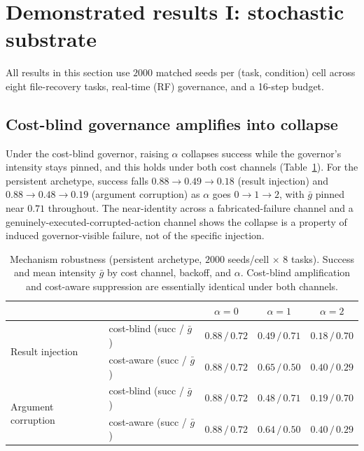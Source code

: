 \documentclass[11pt]{article}
\begin{document}
\section{Demonstrated results I: stochastic substrate}
\label{sec:stochastic}

All results in this section use $2000$ matched seeds per (task, condition)
cell across eight file-recovery tasks, real-time (RF) governance, and a
16-step budget.

\subsection{Cost-blind governance amplifies into collapse}
\label{sec:amplification}

Under the cost-blind governor, raising $\alpha$ collapses success while the
governor's intensity stays pinned, and this holds under both cost channels
(Table~\ref{tab:mechanisms}). For the persistent archetype, success falls
$0.88\to0.49\to0.18$ (result injection) and $0.88\to0.48\to0.19$ (argument
corruption) as $\alpha$ goes $0\to1\to2$, with $\bar g$ pinned near $0.71$
throughout. The near-identity across a fabricated-failure channel and a
genuinely-executed-corrupted-action channel shows the collapse is a property of
induced governor-visible failure, not of the specific injection.

\begin{table}[t]
\centering
\caption{Mechanism robustness (persistent archetype, $2000$ seeds/cell $\times$
$8$ tasks). Success and mean intensity $\bar g$ by cost channel, backoff, and
$\alpha$. Cost-blind amplification and cost-aware suppression are essentially
identical under both channels.}
\label{tab:mechanisms}
\begin{tabular}{llccc}
\toprule
 & & $\alpha{=}0$ & $\alpha{=}1$ & $\alpha{=}2$ \\
\midrule
\multirow{2}{*}{Result injection}
 & cost-blind (succ / $\bar g$)  & $0.88\,/\,0.72$ & $0.49\,/\,0.71$ & $0.18\,/\,0.70$ \\
 & cost-aware (succ / $\bar g$)  & $0.88\,/\,0.72$ & $0.65\,/\,0.50$ & $0.40\,/\,0.29$ \\
\midrule
\multirow{2}{*}{Argument corruption}
 & cost-blind (succ / $\bar g$)  & $0.88\,/\,0.72$ & $0.48\,/\,0.71$ & $0.19\,/\,0.70$ \\
 & cost-aware (succ / $\bar g$)  & $0.88\,/\,0.72$ & $0.64\,/\,0.50$ & $0.40\,/\,0.29$ \\
\bottomrule
\end{tabular}
\end{table}
\end{document}
